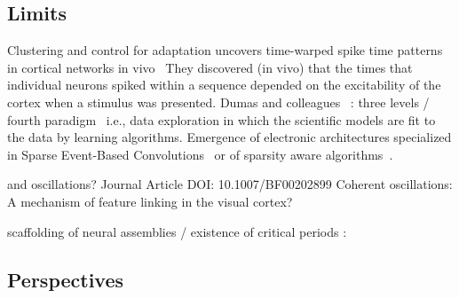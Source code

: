 \documentclass[brainsci, %
               review,submit,pdftex,moreauthors]{Definitions/mdpi}
\begin{document}
\subsection{Limits}

Clustering and control for adaptation uncovers time-warped spike time patterns in cortical networks in vivo~\citep{Isbister} They discovered (in vivo) that the times that individual neurons spiked within a sequence depended on the excitability of the cortex when a stimulus was presented.
Dumas and colleagues~\citep{panahi_generative_2021} : three levels / fourth paradigm~\citep{tolle_fourth_2011} i.e., data exploration in which the scientific models are fit to the data by learning algorithms.
Emergence of electronic architectures specialized in Sparse Event-Based Convolutions~\citep{di_mauro_alfio_sne_2022} or of sparsity aware algorithms~\citep{yin_sata_2022}.

and oscillations? Journal Article DOI: 10.1007/BF00202899 Coherent oscillations: A mechanism of feature linking in the visual cortex?

scaffolding of neural assemblies / existence of critical periods :~\citep{dard_rapid_2021}


\subsection{Perspectives}
\end{document}
